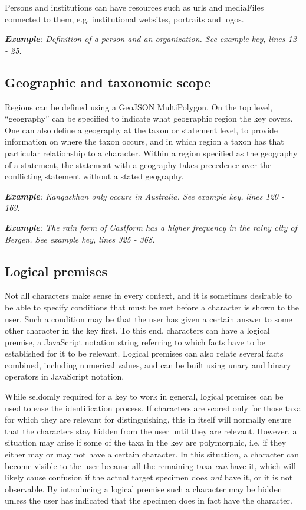 \documentclass[10pt,letterpaper]{article}
\begin{document}
Persons and institutions can have resources such as urls and mediaFiles connected to them, e.g. institutional websites, portraits and logos.


\textit{\textbf{Example}: Definition of a person and an organization. See example key, lines 12 - 25.}
\subsection*{
Geographic and taxonomic scope
}
Regions can be defined using a GeoJSON MultiPolygon. On the top level, ``geography'' can be specified to indicate what geographic region the key covers. One can also define a geography at the taxon or statement level, to provide information on where the taxon occurs, and in which region a taxon has that particular relationship to a character. Within a region specified as the geography of a statement, the statement with a geography takes precedence over the conflicting statement without a stated geography.


\textit{\textbf{Example}: Kangaskhan only occurs in Australia. See example key, lines 120 - 169.}


\textit{\textbf{Example}: The rain form of Castform has a higher frequency in the rainy city of Bergen. See example key, lines 325 - 368.}
\subsection*{
Logical premises
}
Not all characters make sense in every context, and it is sometimes desirable to be able to specify conditions that must be met before a character is shown to the user. Such a condition may be that the user has given a certain answer to some other character in the key first. To this end, characters can have a logical premise, a JavaScript notation string referring to which facts have to be established for it to be relevant. Logical premises can also relate several facts combined, including numerical values, and can be built using unary and binary operators in JavaScript notation.

While seldomly required for a key to work in general, logical premises can be used to ease the identification process. If characters are scored only for those taxa for which they are relevant for distinguishing, this in itself will normally ensure that the characters stay hidden from the user until they are relevant. However, a situation may arise if some of the taxa in the key are polymorphic, i.e. if they either may or may not have a certain character. In this situation, a character can become visible to the user because all the remaining taxa \textit{can} have it, which will likely cause confusion if the actual target specimen does \textit{not} have it, or it is not observable. By introducing a logical premise such a character may be hidden unless the user has indicated that the specimen does in fact have the character.
\end{document}
